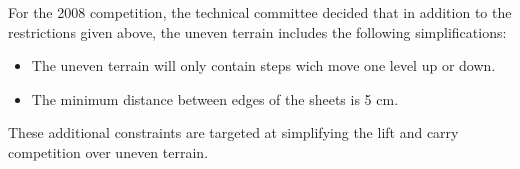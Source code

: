\documentclass[12pt]{hurocup}
\begin{document}
\begin{decisions}
\item For the 2008 competition, the technical committee decided that
in addition to the restrictions given above, the uneven terrain
includes the following simplifications:
\begin{itemize}
\item The uneven terrain will only contain steps wich move one level
up or down.
\item The minimum distance between edges of the sheets is 5 cm.
\end{itemize}
These additional constraints are targeted at simplifying the lift and
carry competition over uneven terrain.

\end{decisions}
\end{document}
